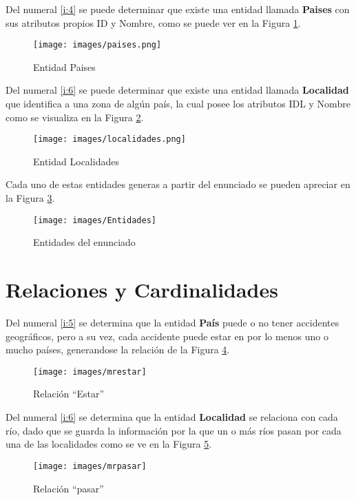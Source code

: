 \documentclass[letter,12pt]{report}
\begin{document}
Del numeral \ref{i:4} se puede determinar que existe una entidad llamada \textbf{Paises} con sus atributos propios ID y Nombre, como se puede ver en la Figura \ref{f:paises}.

\begin{figure}[H]\centering
  \texttt{[image: images/paises.png]}
  \caption{Entidad Paises}
  \label{f:paises}
\end{figure}

Del numeral \ref{i:6} se puede determinar que existe una entidad llamada \textbf{Localidad} que identifica a una zona de algún país, la cual posee los atributos IDL y Nombre como se visualiza en la Figura \ref{f:localidades}.

\begin{figure}[H]\centering
  \texttt{[image: images/localidades.png]}
  \caption{Entidad Localidades}
  \label{f:localidades}
\end{figure}

Cada uno de estas entidades generas a partir del enunciado se pueden apreciar en la Figura \ref{f:entidades}.


\begin{figure}[H]\centering
  \texttt{[image: images/Entidades]}
  \caption{Entidades del enunciado}
  \label{f:entidades}
\end{figure}


\section{Relaciones y Cardinalidades}

Del numeral \ref{i:5} se determina que la entidad \textbf{País} puede o no tener accidentes geográficos, pero a su vez, cada accidente puede estar en por lo menos uno o mucho países, generandose la relación de la Figura \ref{f:estar}.

\begin{figure}[H]
\centering
  \texttt{[image: images/mrestar]}
  \caption{Relación ``Estar''}
  \label{f:estar}
\end{figure}

Del numeral \ref{i:6} se determina que la entidad \textbf{Localidad} se relaciona con cada río, dado que se guarda la información por la que un o más ríos pasan por cada una de las localidades como se ve en la Figura \ref{f:pasar}.

\begin{figure}[H]
\centering
  \texttt{[image: images/mrpasar]}
  \caption{Relación ``pasar''}
  \label{f:pasar}
\end{figure}
\end{document}
